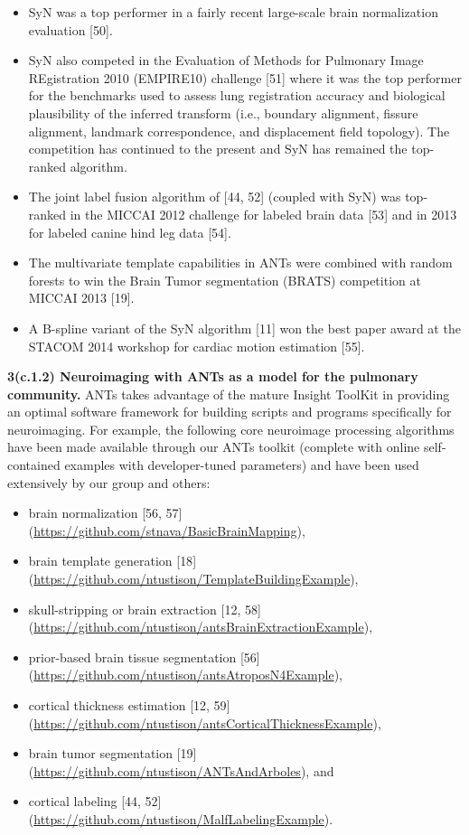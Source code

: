 \documentclass[11pt,]{article}
\begin{document}
\begin{itemize}
\itemsep1pt\parskip0pt
\item
  SyN was a top performer in a fairly recent large-scale brain
  normalization evaluation {[}50{]}.
\item
  SyN also competed in the Evaluation of Methods for Pulmonary Image
  REgistration 2010 (EMPIRE10) challenge {[}51{]} where it was the top
  performer for the benchmarks used to assess lung registration accuracy
  and biological plausibility of the inferred transform (i.e., boundary
  alignment, fissure alignment, landmark correspondence, and
  displacement field topology). The competition has continued to the
  present and SyN has remained the top-ranked algorithm.
\item
  The joint label fusion algorithm of {[}44, 52{]} (coupled with SyN)
  was top-ranked in the MICCAI 2012 challenge for labeled brain data
  {[}53{]} and in 2013 for labeled canine hind leg data {[}54{]}.
\item
  The multivariate template capabilities in ANTs were combined with
  random forests to win the Brain Tumor segmentation (BRATS) competition
  at MICCAI 2013 {[}19{]}.
\item
  A B-spline variant of the SyN algorithm {[}11{]} won the best paper
  award at the STACOM 2014 workshop for cardiac motion estimation
  {[}55{]}.
\end{itemize}

\textbf{3(c.1.2) Neuroimaging with ANTs as a model for the pulmonary
community.} ANTs takes advantage of the mature Insight ToolKit in
providing an optimal software framework for building scripts and
programs specifically for neuroimaging. For example, the following core
neuroimage processing algorithms have been made available through our
ANTs toolkit (complete with online self-contained examples with
developer-tuned parameters) and have been used extensively by our group
and others:

\begin{itemize}
\itemsep1pt\parskip0pt
\item
  brain normalization {[}56, 57{]}
  (\url{https://github.com/stnava/BasicBrainMapping}),
\item
  brain template generation {[}18{]}
  (\url{https://github.com/ntustison/TemplateBuildingExample}),
\item
  skull-stripping or brain extraction {[}12, 58{]}
  (\url{https://github.com/ntustison/antsBrainExtractionExample}),
\item
  prior-based brain tissue segmentation {[}56{]}
  (\url{https://github.com/ntustison/antsAtroposN4Example}),
\item
  cortical thickness estimation {[}12, 59{]}
  (\url{https://github.com/ntustison/antsCorticalThicknessExample}),
\item
  brain tumor segmentation {[}19{]}
  (\url{https://github.com/ntustison/ANTsAndArboles}), and
\item
  cortical labeling {[}44, 52{]}
  (\url{https://github.com/ntustison/MalfLabelingExample}).
\end{itemize}
\end{document}
